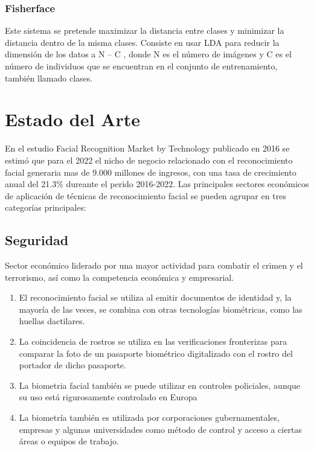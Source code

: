 \documentclass[a4paper,11pt]{book}
\begin{document}
\subsection{ Fisherface}

Este sistema\cite{vs} se pretende maximizar la distancia entre clases y minimizar la distancia dentro de la misma clases. Consiste en usar LDA para reducir la
dimensión de los datos a N – C , donde N es el número de imágenes y C es el número de individuos que se encuentran en el conjunto de entrenamiento, también llamado clases. 

\chapter{Estado del Arte}

En el estudio Facial Recognition Market by Technology\cite{market} publicado en 2016 se estimó que para el 2022 el nicho de negocio relacionado con el reconocimiento facial generaria mas de 9.000 millones de ingresos, con una tasa de crecimiento anual del 21.3\% dureante el perido 2016-2022. Las principales sectores económicos de aplicación de técnicas de reconocimiento facial se pueden agrupar en tres categorías principales: 

\section{Seguridad}
Sector económico liderado por una mayor actividad para combatir el crimen y el terrorismo, así como la competencia económica y empresarial. 

\begin{enumerate}
\item El reconocimiento facial se utiliza al emitir documentos de identidad y, la mayoría de las veces, se combina con otras tecnologías biométricas, como las huellas dactilares.

\item La coincidencia de rostros se utiliza en las verificaciones fronterizas para comparar la foto de un pasaporte biométrico digitalizado con el rostro del portador de dicho pasaporte. 


\item La biometria facial también se puede utilizar en controles policiales, aunque su uso está rigurosamente controlado en Europa

\item La biometría también es utilizada por corporaciones gubernamentales, empresas y algunas universidades como método de control y acceso a ciertas áreas o equipos de trabajo. 

\end{enumerate}
\end{document}

